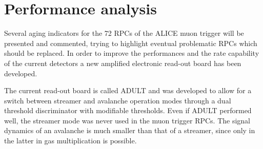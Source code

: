 
\section{Performance analysis}
Several aging indicators for the 72 RPCs of the ALICE muon trigger will be presented and commented, trying to highlight eventual problematic RPCs which should be replaced.
In order to improve the performances and the rate capability of the current detectors a new amplified electronic read-out board has been developed.

The current read-out board is called ADULT and was developed to allow for a switch between streamer and avalanche operation modes through a dual threshold discriminator with modifiable thresholds.
Even if ADULT performed well, the streamer mode was never used in the muon trigger RPCs.
The signal dynamics of an avalanche is much smaller than that of a streamer, since only in the latter in gas multiplication is possible.

